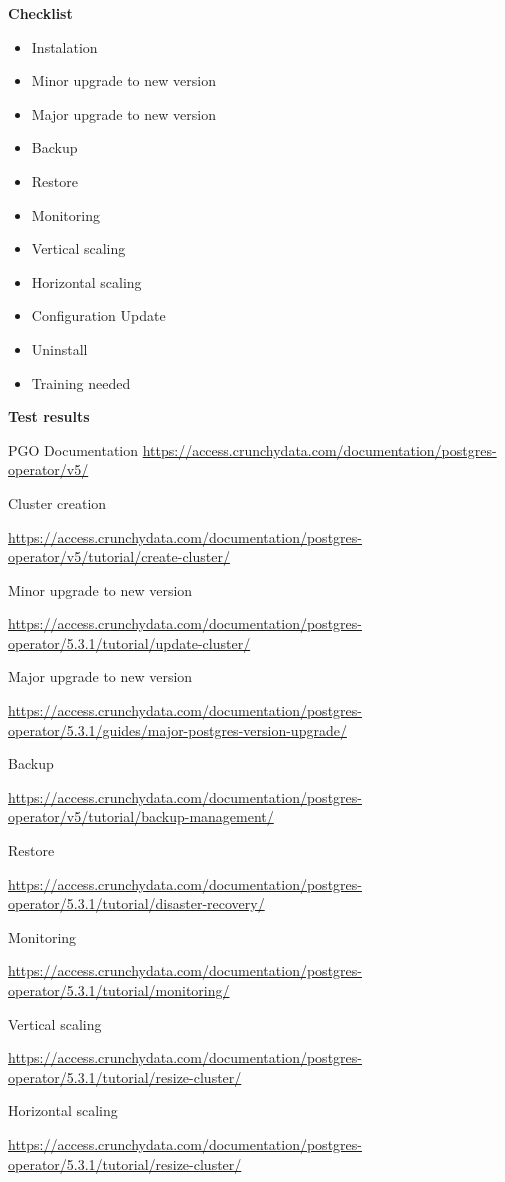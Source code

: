 \textbf{Checklist}
\begin{itemize}
    \item Instalation
    \item Minor upgrade to new version
    \item Major upgrade to new version
    \item Backup
    \item Restore
    \item Monitoring
    \item Vertical scaling
    \item Horizontal scaling
    \item Configuration Update
    \item Uninstall
    \item Training needed
\end{itemize}
\textbf{Test results}

PGO
Documentation
\sloppy
\url{https://access.crunchydata.com/documentation/postgres-operator/v5/}

Cluster creation

\url{https://access.crunchydata.com/documentation/postgres-operator/v5/tutorial/create-cluster/}

Minor upgrade to new version

\url{https://access.crunchydata.com/documentation/postgres-operator/5.3.1/tutorial/update-cluster/}

Major upgrade to new version

\url{https://access.crunchydata.com/documentation/postgres-operator/5.3.1/guides/major-postgres-version-upgrade/}

Backup

\url{https://access.crunchydata.com/documentation/postgres-operator/v5/tutorial/backup-management/}

Restore

\url{https://access.crunchydata.com/documentation/postgres-operator/5.3.1/tutorial/disaster-recovery/}

Monitoring

\url{https://access.crunchydata.com/documentation/postgres-operator/5.3.1/tutorial/monitoring/}

Vertical scaling

\url{https://access.crunchydata.com/documentation/postgres-operator/5.3.1/tutorial/resize-cluster/}

Horizontal scaling

\url{https://access.crunchydata.com/documentation/postgres-operator/5.3.1/tutorial/resize-cluster/}

